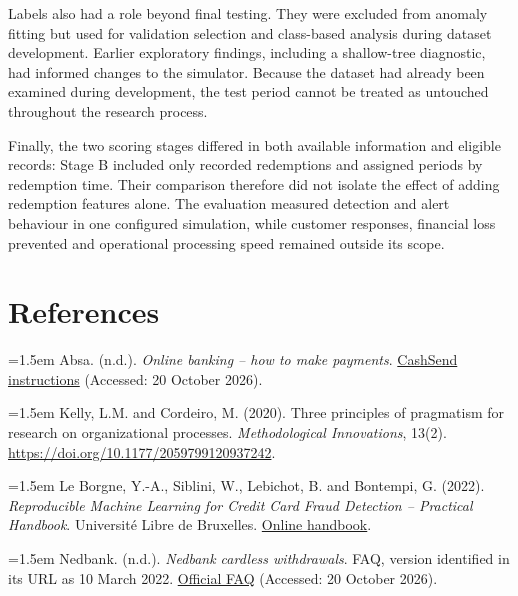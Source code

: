 \documentclass[11pt,a4paper]{article}
\begin{document}
Labels also had a role beyond final testing. They were excluded from anomaly fitting but used for validation selection and class-based analysis during dataset development. Earlier exploratory findings, including a shallow-tree diagnostic, had informed changes to the simulator. Because the dataset had already been examined during development, the test period cannot be treated as untouched throughout the research process.

Finally, the two scoring stages differed in both available information and eligible records: Stage B included only recorded redemptions and assigned periods by redemption time. Their comparison therefore did not isolate the effect of adding redemption features alone. The evaluation measured detection and alert behaviour in one configured simulation, while customer responses, financial loss prevented and operational processing speed remained outside its scope.

\clearpage
\section*{References}


{\small\hangindent=1.5em Absa. (n.d.). \emph{Online banking -- how to make payments}. \href{https://www.absa.co.za/help/how-to-make-payments/}{CashSend instructions} (Accessed: 20 October 2026).\par}

{\small\hangindent=1.5em Kelly, L.M. and Cordeiro, M. (2020). Three principles of pragmatism for research on organizational processes. \emph{Methodological Innovations}, 13(2). \url{https://doi.org/10.1177/2059799120937242}.\par}

{\small\hangindent=1.5em Le Borgne, Y.-A., Siblini, W., Lebichot, B. and Bontempi, G. (2022). \emph{Reproducible Machine Learning for Credit Card Fraud Detection -- Practical Handbook}. Universit\'e Libre de Bruxelles. \href{https://fraud-detection-handbook.github.io/fraud-detection-handbook/}{Online handbook}.\par}

{\small\hangindent=1.5em Nedbank. (n.d.). \emph{Nedbank cardless withdrawals}. FAQ, version identified in its URL as 10 March 2022. \href{https://www.nedbank.co.za/content/dam/nedbank/site-assets/Personal/Digital/Toolsandguidance/FAQs\%20-\%20Nedbank\%20Cardless\%20Withdrawal\%2010\%20March\%202022.pdf}{Official FAQ} (Accessed: 20 October 2026).\par}
\end{document}
